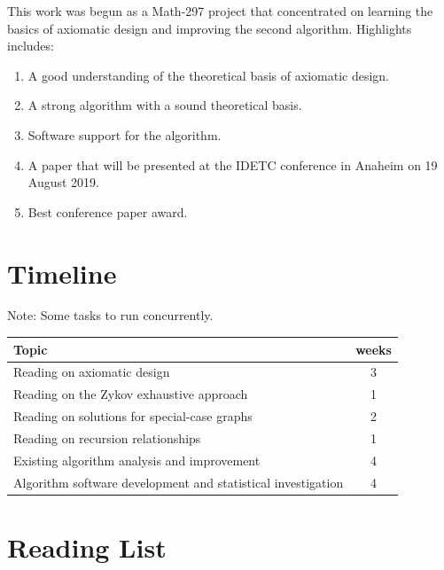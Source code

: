 \documentclass[letterpaper,12pt]{article}
\begin{document}
This work was begun as a Math-297 project that concentrated on learning the basics of axiomatic design and improving
the second algorithm.  Highlights includes:

\begin{enumerate}
\item A good understanding of the theoretical basis of axiomatic design.
\item A strong algorithm with a sound theoretical basis.
\item Software support for the algorithm.
\item A paper that will be presented at the IDETC conference in Anaheim on 19 August 2019.
\item Best conference paper award.
\end{enumerate}

\section*{Timeline}

Note: Some tasks to run concurrently.

\begin{tabular}{|l|c|}
  \hline
  \textbf{Topic} & \textbf{weeks} \\
  \hline
  Reading on axiomatic design & 3 \\
  Reading on the Zykov exhaustive approach & 1 \\
  Reading on solutions for special-case graphs & 2 \\
  Reading on recursion relationships & 1 \\
  Existing algorithm analysis and improvement & 4 \\
  Algorithm software development and statistical investigation & 4 \\
  \hline
\end{tabular}

\section*{Reading List}

\begingroup
\renewcommand{\section}[2]{}%
\nocite{*}
 

\endgroup
\end{document}
